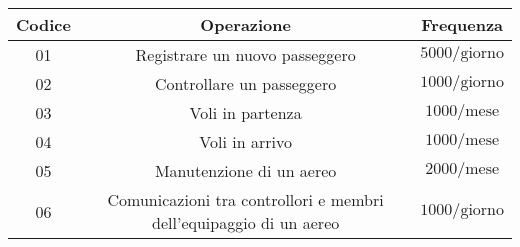 \begin{tabular}{ | c c c |} %
	\hline
	\textbf{Codice} & \textbf{Operazione} & \textbf{Frequenza} \\
	\hline
	\textsf{\small 01} & \textsf{\small Registrare un nuovo passeggero} & \textsf{\small $5000/\text{giorno}$} \\ %
	\hline
	\textsf{\small 02} & \textsf{\small Controllare un passeggero} & \textsf{\small $ 1000 / \text{giorno} $} \\
	\hline
	\textsf{\small 03} & \textsf{\small Voli in partenza} & \textsf{\small $ 1000 / \text{mese} $} \\
	\hline
	\textsf{\small 04} & \textsf{\small Voli in arrivo} & \textsf{\small $ 1000 / \text{mese} $} \\
	\hline
	\textsf{\small 05} & \textsf{\small Manutenzione di un aereo} & \textsf{\small $ 2000 / \text{mese} $} \\
	\hline
	\textsf{\small 06} & \textsf{\small Comunicazioni tra controllori e membri dell'equipaggio di un aereo} & \textsf{\small $ 1000 / \text{giorno} $} \\
	
	
	
	
	

\end{tabular}
